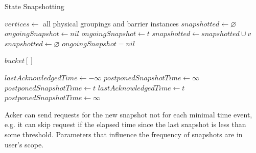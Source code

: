 \begin{algorithm}
\caption{State Snapshotting}
\label{state-snapshoting}
  \begin{algorithmic}
      \State $vertices \gets$ all physical groupings and barrier instances
      \State $snapshotted \gets \varnothing$
      \State $ongoingSnapshot \gets nil$
      \State
         
            \State {}
          \EndFor
          \State $ongoingSnapshot \gets t$
        \EndIf
      \EndEvent
        \State $snapshotted \gets snapshotted \cup v$
          \State {} 
          \State $snapshotted \gets \varnothing$
          \State $ongoingSnapshot = nil$
        \EndIf
      \EndEvent
    \EndProcess

      \State $bucket[]$ 
      \State
        \State {} 
        \State {}
        \State {}
      \EndEvent
    \EndProcess

      \State $lastAcknowledgedTime \gets -\infty$ 
      \State $postponedSnapshotTime \gets \infty$
      \State
          \State {}
        \Else
          \State $postponedSnapshotTime \gets t$
        \EndIf
      \EndEvent
        \State $lastAcknowledgedTime \gets t$
          \State {}
          \State $postponedSnapshotTime \gets \infty$
        \EndIf
      \EndEvent
    \EndProcess
  \end{algorithmic}
\end{algorithm}

Acker can send requests for the new snapshot not for each minimal time event, e.g. it can skip request if the elapsed time since the last snapshot is less than some threshold. Parameters that influence the frequency of snapshots are in user's scope.

